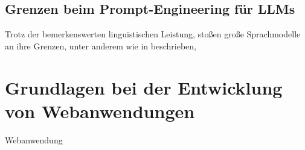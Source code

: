 




\subsection{Grenzen beim Prompt-Engineering für LLMs}
Trotz der bemerkenswerten linguistischen Leistung, stoßen große Sprachmodelle an ihre Grenzen, unter anderem wie in \cite{amatriain-2024} beschrieben,




\section{Grundlagen bei der Entwicklung von Webanwendungen}
Webanwendung
